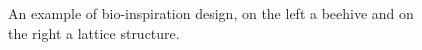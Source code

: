 \begin{figure}[H]
    \centering
    \quad
    \caption[Bio-inspiration design.]{An example of bio-inspiration design, on the left a beehive and on the right a lattice structure.}
    \label{fig:bioinsp}
\end{figure}

